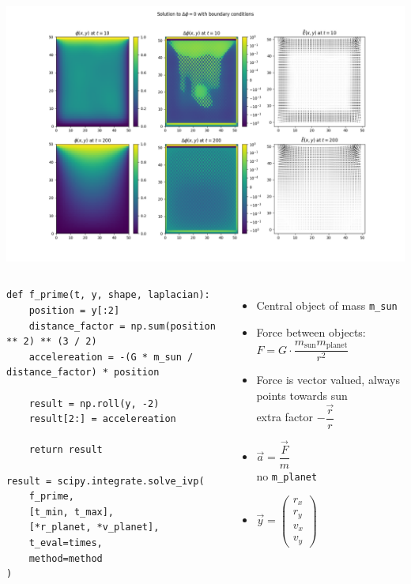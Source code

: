 
\begin{frame}
%
\includegraphics[width=\linewidth]{./gfx/04-Laplacian}
%
\end{frame}


\begin{frame}[fragile]
%
\begin{columns}
\begin{codebox}
\begin{verbatim}
def f_prime(t, y, shape, laplacian):
    position = y[:2]
    distance_factor = np.sum(position ** 2) ** (3 / 2)
    accelereation = -(G * m_sun / distance_factor) * position

    result = np.roll(y, -2)
    result[2:] = accelereation

    return result

result = scipy.integrate.solve_ivp(
    f_prime,
    [t_min, t_max], 
    [*r_planet, *v_planet],
    t_eval=times,
    method=method
)
\end{verbatim}
\end{codebox}
%
\begin{itemize}
\item Central object of mass \texttt{m\_sun}
\item Force between objects: $F = G \cdot \dfrac{m_{\text{sun}} m_{\text{planet}}}{r^2}$
\item Force is vector valued, always points towards sun\\
	\Thus extra factor $-\dfrac{\vec{r}}{r}$
\item $\vec{a} = \dfrac{\vec{F}}{m}$ \\
	\Thus no \texttt{m\_planet}
\item $\vec{y} = 
	\begin{pmatrix}
	r_x \\ r_y \\ v_x \\ v_y
	\end{pmatrix}$
\end{itemize}
\end{columns}
%
\end{frame}


